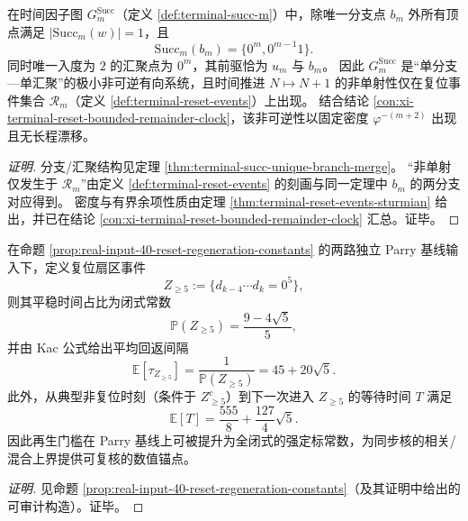 \begin{conclusion}[Zeckendorf 时间因子图的最小非可逆性：一分支一汇聚 \texorpdfstring{$\Rightarrow$}{=>} 非单射仅支撑于 \texorpdfstring{$\mathcal R_m$}{R_m}]\label{con:xi-terminal-succ-minimal-noninvertibility}
在时间因子图 \(G^{\mathrm{Succ}}_m\)（定义 \ref{def:terminal-succ-m}）中，除唯一分支点 \(b_m\) 外所有顶点满足 \(|\mathrm{Succ}_m(w)|=1\)，且
\[
\mathrm{Succ}_m(b_m)=\{0^m,0^{m-1}1\}.
\]
同时唯一入度为 \(2\) 的汇聚点为 \(0^m\)，其前驱恰为 \(u_m\) 与 \(b_m\)。
因此 \(G^{\mathrm{Succ}}_m\) 是“单分支—单汇聚”的极小非可逆有向系统，且时间推进 \(N\mapsto N+1\) 的非单射性仅在复位事件集合 \(\mathcal R_m\)（定义 \ref{def:terminal-reset-events}）上出现。
结合结论 \ref{con:xi-terminal-reset-bounded-remainder-clock}，该非可逆性以固定密度 \(\varphi^{-(m+2)}\) 出现且无长程漂移。
\end{conclusion}
\begin{proof}[证明]
分支/汇聚结构见定理 \ref{thm:terminal-succ-unique-branch-merge}。
“非单射仅发生于 \(\mathcal R_m\)”由定义 \ref{def:terminal-reset-events} 的刻画与同一定理中 \(b_m\) 的两分支对应得到。
密度与有界余项性质由定理 \ref{thm:terminal-reset-events-sturmian} 给出，并已在结论 \ref{con:xi-terminal-reset-bounded-remainder-clock} 汇总。证毕。
\end{proof}

\begin{conclusion}\label{con:xi-terminal-parry-reset-sector-constants}
在命题 \ref{prop:real-input-40-reset-regeneration-constants} 的两路独立 Parry 基线输入下，定义复位扇区事件
\[
Z_{\ge 5}:=\{d_{k-4}\cdots d_k=0^5\},
\]
则其平稳时间占比为闭式常数
\[
\mathbb P(Z_{\ge 5})=\frac{9-4\sqrt5}{5},
\]
并由 Kac 公式给出平均回返间隔
\[
\mathbb E[\tau_{Z_{\ge 5}}]=\frac{1}{\mathbb P(Z_{\ge 5})}=45+20\sqrt5.
\]
此外，从典型非复位时刻（条件于 \(Z_{\ge 5}^c\)）到下一次进入 \(Z_{\ge 5}\) 的等待时间 \(T\) 满足
\[
\mathbb E[T]=\frac{555}{8}+\frac{127}{4}\sqrt5.
\]
因此再生门槛在 Parry 基线上可被提升为全闭式的强定标常数，为同步核的相关/混合上界提供可复核的数值锚点。
\end{conclusion}
\begin{proof}[证明]
见命题 \ref{prop:real-input-40-reset-regeneration-constants}（及其证明中给出的可审计构造）。证毕。
\end{proof}

